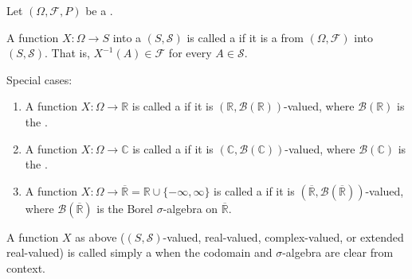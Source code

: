 \begin{definition} \label{definition:random_variable_on_a_probability_measure_space}
Let $(\Omega, \mathcal{F}, P)$ be a .

A function $X : \Omega \to S$ into a  $(S, \mathcal{S})$ is called a  if it is a  from $(\Omega, \mathcal{F})$ into $(S, \mathcal{S})$. That is, $X^{-1}(A) \in \mathcal{F}$ for every $A \in \mathcal{S}$.

Special cases:
\begin{enumerate}
    \item A function $X : \Omega \to \mathbb{R}$ is called a  if it is $(\mathbb{R}, \mathcal{B}(\mathbb{R}))$-valued, where $\mathcal{B}(\mathbb{R})$ is the .

    \item A function $X : \Omega \to \mathbb{C}$ is called a  if it is $(\mathbb{C}, \mathcal{B}(\mathbb{C}))$-valued, where $\mathcal{B}(\mathbb{C})$ is the .

    \item A function $X : \Omega \to \overline{\mathbb{R}} = \mathbb{R} \cup \{-\infty, \infty\}$ is called a  if it is $(\overline{\mathbb{R}}, \mathcal{B}(\overline{\mathbb{R}}))$-valued, where $\mathcal{B}(\overline{\mathbb{R}})$ is the Borel $\sigma$-algebra on $\overline{\mathbb{R}}$. 
\end{enumerate}

A function $X$ as above ($(S, \mathcal{S})$-valued, real-valued, complex-valued, or extended real-valued) is called simply a  when the codomain and $\sigma$-algebra are clear from context.
\end{definition}
